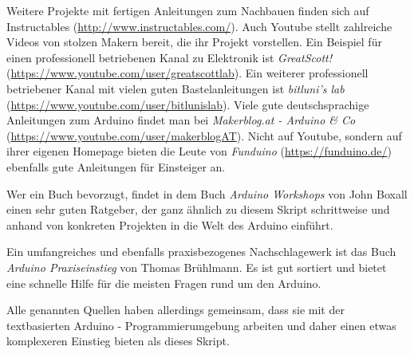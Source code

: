 Weitere Projekte mit fertigen Anleitungen zum Nachbauen finden sich auf Instructables (\url{http://www.instructables.com/}). Auch Youtube stellt zahlreiche Videos von stolzen Makern bereit, die ihr Projekt vorstellen. Ein Beispiel für einen professionell betriebenen Kanal zu Elektronik ist \emph{GreatScott!} (\url{https://www.youtube.com/user/greatscottlab}). Ein weiterer professionell betriebener Kanal mit vielen guten Bastelanleitungen ist \emph{bitluni's lab} (\url{https://www.youtube.com/user/bitlunislab}). Viele gute deutschsprachige Anleitungen zum Arduino findet man bei \emph{Makerblog.at - Arduino \& Co} (\url{https://www.youtube.com/user/makerblogAT}). Nicht auf Youtube, sondern auf ihrer eigenen Homepage bieten die Leute von \emph{Funduino} (\url{https://funduino.de/}) ebenfalls gute Anleitungen für Einsteiger an.

Wer ein Buch bevorzugt, findet in dem Buch \emph{Arduino Workshops} von John Boxall einen sehr guten Ratgeber, der ganz ähnlich zu diesem Skript schrittweise und anhand von konkreten Projekten in die Welt des Arduino einführt.

Ein umfangreiches und ebenfalls praxisbezogenes Nachschlagewerk ist das Buch \emph{Arduino Praxiseinstieg} von Thomas Brühlmann. Es ist gut sortiert und bietet eine schnelle Hilfe für die meisten Fragen rund um den Arduino.

Alle genannten Quellen haben allerdings gemeinsam, dass sie mit der textbasierten Arduino - Programmierumgebung arbeiten und daher einen etwas komplexeren Einstieg bieten als dieses Skript.

\clearpage